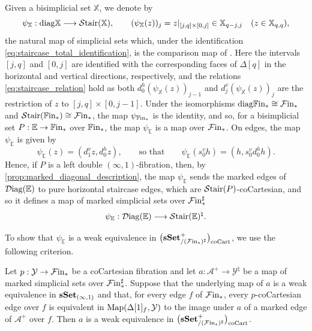 \documentclass[10pt,reqno]{amsart}
\begin{document}
\begin{construction}
\label{const:diagonal_to_staircase}
Given a bisimplicial set $\mathbb X$, we denote by
\[
 \psi_{\mathbb X}:\mathrm{diag}\mathbb X\longrightarrow\mathcal{S}\mathrm{tair}(\mathbb X),
 \qquad
 (\psi_{\mathbb X}(z))_j
 =z|_{[j,q]\times[0,j]}\in\mathbb X_{q-j,j}
 \quad(z\in\mathbb X_{q,q}),
\]
the natural map of simplicial sets which, under the identification
\eqref{eq:staircase_total_identification}, is the comparison map of
\cite[Definition~3.6]{Stevenson2025TotalSimplicialSet}. Here the
intervals $[j,q]$ and $[0,j]$ are identified with the
corresponding faces of $\Delta[q]$ in the horizontal and vertical
directions, respectively, and the relations
\eqref{eq:staircase_relation} hold as both
$d_0^h(\psi_{\mathbb X}(z))_{j-1}$ and
$d_j^v(\psi_{\mathbb X}(z))_j$ are the restriction of $z$ to
$[j,q]\times[0,j-1]$. Under the isomorphisms
$\mathrm{diag}\mathbb{F}\mathrm{in}_*\cong \mathcal{F}\mathrm{in}_*$ and
$\mathcal{S}\mathrm{tair}(\mathbb{F}\mathrm{in}_*)\cong \mathcal{F}\mathrm{in}_*$, the map $\psi_{\mathbb{F}\mathrm{in}_*}$ is the
identity, and so, for a bisimplicial set $P:\mathbb E\to\mathbb{F}\mathrm{in}_*$
over $\mathbb{F}\mathrm{in}_*$, the map $\psi_{\mathbb E}$ is a map over
$\mathcal{F}\mathrm{in}_*$. On edges, the map $\psi_{\mathbb E}$ is given by
\[
 \psi_{\mathbb E}(z)=(d_1^v z,d_0^h z),
 \qquad\text{so that}\qquad
 \psi_{\mathbb E}(s_0^v h)=(h,s_0^v d_0^h h).
\]
Hence, if $P$ is a left double $(\infty,1)$-fibration, then, by
\cref{prop:marked_diagonal_description}, the map $\psi_{\mathbb E}$
sends the marked edges of $\mathcal{D}\mathrm{iag}(\mathbb E)$ to pure horizontal
staircase edges, which are $\mathcal{S}\mathrm{tair}(P)$-coCartesian, and so it
defines a map of marked simplicial sets over $\mathcal{F}\mathrm{in}_*^\sharp$
\[
 \psi_{\mathbb E}:\mathcal{D}\mathrm{iag}(\mathbb E)
 \longrightarrow\mathcal{S}\mathrm{tair}(\mathbb E)^\natural.
\]
\end{construction}

To show that $\psi_{\mathbb E}$ is a weak equivalence in
$\bigl(\mathbf{sSet}^+_{/(\mathcal{F}\mathrm{in}_*)^\sharp}\bigr)_{\mathrm{coCart}}$, we use the following criterion.

\begin{lemma}
\label{lem:enough_marked_cocartesian_lifts}
Let $p:\mathcal Y\to \mathcal{F}\mathrm{in}_*$ be a coCartesian fibration and let
$a:\mathcal A^+\to \mathcal Y^\natural$ be a map of marked
simplicial sets over $\mathcal{F}\mathrm{in}_*^\sharp$. Suppose that the underlying
map of $a$ is a weak equivalence in $\mathbf{sSet}_{(\infty,1)}$ and that,
for every edge $f$ of $\mathcal{F}\mathrm{in}_*$, every $p$-coCartesian edge over
$f$ is equivalent in $\operatorname{Map}(\Delta[1]_f,\mathcal Y)$ to the image
under $a$ of a marked edge of $\mathcal A^+$ over $f$. Then $a$
is a weak equivalence in $\bigl(\mathbf{sSet}^+_{/(\mathcal{F}\mathrm{in}_*)^\sharp}\bigr)_{\mathrm{coCart}}$.
\end{lemma}
\end{document}
